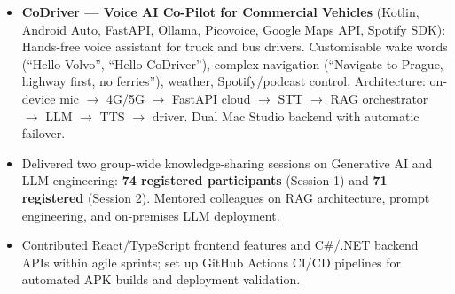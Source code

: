 \documentclass[a4paper,10pt]{article}
\begin{document}
\begin{itemize}[noitemsep]
        Agentic system for Volvo Trucks: plate number input $\to$ retrieves truck profile,
        service history, and parts data from a domain-specific kb.json (truck invoices,
        fleet records, service manuals, ERP accessories data) $\to$ generates full service
        contract draft including battery replacement booking $\to$ agent approves in one
        final step only. \textbf{Reduced contract generation from $\sim$40 minutes to
        near-instant.} Volvo Trucks department has made multiple follow-up contacts
        requesting a production rollout.
  \item \textbf{CoDriver --- Voice AI Co-Pilot for Commercial Vehicles} (Kotlin, Android
        Auto, FastAPI, Ollama, Picovoice, Google Maps API, Spotify SDK): Hands-free voice
        assistant for truck and bus drivers. Customisable wake words (``Hello Volvo'',
        ``Hello CoDriver''), complex navigation (``Navigate to Prague, highway first, no
        ferries''), weather, Spotify/podcast control. Architecture: on-device mic $\to$
        4G/5G $\to$ FastAPI cloud $\to$ STT $\to$ RAG orchestrator $\to$ LLM $\to$
        TTS $\to$ driver. Dual Mac Studio backend with automatic failover.
  \item Delivered two group-wide knowledge-sharing sessions on Generative AI and LLM
        engineering: \textbf{74 registered participants} (Session 1) and \textbf{71
        registered} (Session 2). Mentored colleagues on RAG architecture, prompt
        engineering, and on-premises LLM deployment.
  \item Contributed React/TypeScript frontend features and C\#/.NET backend APIs within
        agile sprints; set up GitHub Actions CI/CD pipelines for automated APK builds
        and deployment validation.
\end{itemize}
\end{document}
